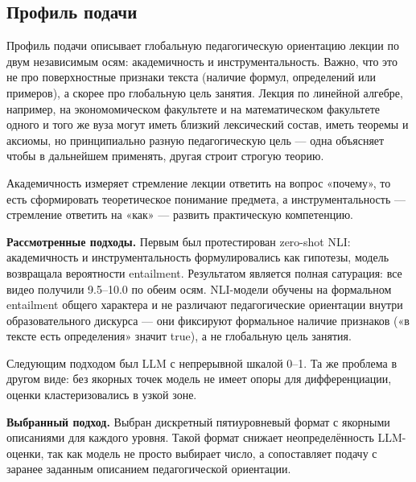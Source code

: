 \subsection{Профиль подачи}
\label{sec:method-profile}

Профиль подачи описывает глобальную педагогическую ориентацию лекции по двум независимым осям: академичность и инструментальность.
Важно, что это не про поверхностные признаки текста (наличие формул, определений или примеров), а скорее про глобальную цель занятия.
Лекция по линейной алгебре, например, на  экономомическом факультете и на математическом факультете одного и того же вуза 
могут иметь близкий лексический состав, иметь теоремы и аксиомы,
но принципиально разную педагогическую цель — одна объясняет чтобы в дальнейшем применять, другая строит строгую теорию.

Академичность измеряет стремление лекции ответить на вопрос «почему», то есть сформировать теоретическое понимание предмета, а 
инструментальность — стремление ответить на «как» — развить практическую компетенцию.

\textbf{Рассмотренные подходы.} Первым был протестирован zero-shot NLI: академичность и инструментальность формулировались как гипотезы, модель возвращала вероятности entailment.
Результатом является полная сатурация: все видео получили 9.5–10.0 по обеим осям.
NLI-модели обучены на формальном entailment общего характера и не различают педагогические ориентации внутри образовательного дискурса
— они фиксируют формальное наличие признаков («в тексте есть определения» значит true), а не глобальную цель занятия.

Следующим подходом был LLM с непрерывной шкалой 0–1. Та же проблема в другом виде: без якорных точек модель не имеет опоры для дифференциации, оценки кластеризовались в узкой зоне.

\textbf{Выбранный подход.} Выбран дискретный пятиуровневый формат
с якорными описаниями для каждого уровня. Такой формат снижает
неопределённость LLM-оценки, так как модель не просто выбирает число, а сопоставляет
подачу с заранее заданным описанием педагогической ориентации.

